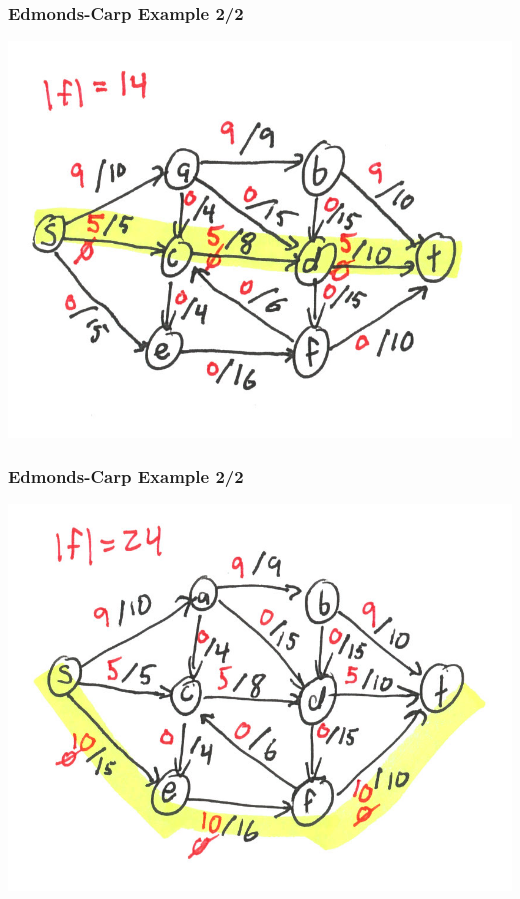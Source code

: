 \documentclass[10pt,aspectratio=169]{beamer}
\begin{document}
\begin{frame} \frametitle{Edmonds-Carp Example 2/2}
\begin{center}
  \includegraphics[scale=1]{ek-2-3.png}
\end{center}
\end{frame}

\begin{frame} \frametitle{Edmonds-Carp Example 2/2}
\begin{center}
  \includegraphics[scale=1]{ek-2-4.png}
\end{center}
\end{frame}
\end{document}
